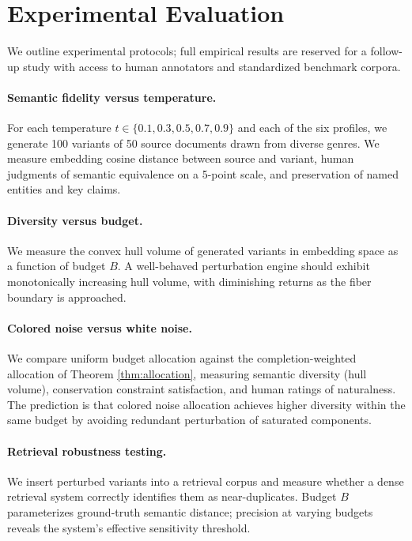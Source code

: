 \documentclass[12pt, a4paper]{article}
\theoremstyle{plain}
\theoremstyle{definition}
\theoremstyle{remark}
\begin{document}
\section{Experimental Evaluation}
\label{sec:experiments}

We outline experimental protocols; full empirical results are reserved for a
follow-up study with access to human annotators and standardized benchmark
corpora.

\paragraph{Semantic fidelity versus temperature.}
For each temperature $t \in \{0.1, 0.3, 0.5, 0.7, 0.9\}$ and each of the six
profiles, we generate 100 variants of 50 source documents drawn from diverse
genres.  We measure embedding cosine distance between source and variant, human
judgments of semantic equivalence on a 5-point scale, and preservation of
named entities and key claims.

\paragraph{Diversity versus budget.}
We measure the convex hull volume of generated variants in embedding space as a
function of budget $B$.  A well-behaved perturbation engine should exhibit
monotonically increasing hull volume, with diminishing returns as the fiber
boundary is approached.

\paragraph{Colored noise versus white noise.}
We compare uniform budget allocation against the completion-weighted allocation
of Theorem \ref{thm:allocation}, measuring semantic diversity (hull volume),
conservation constraint satisfaction, and human ratings of naturalness.  The
prediction is that colored noise allocation achieves higher diversity within the
same budget by avoiding redundant perturbation of saturated components.

\paragraph{Retrieval robustness testing.}
We insert perturbed variants into a retrieval corpus and measure whether a dense
retrieval system correctly identifies them as near-duplicates.  Budget $B$
parameterizes ground-truth semantic distance; precision at varying budgets
reveals the system's effective sensitivity threshold.
\end{document}
